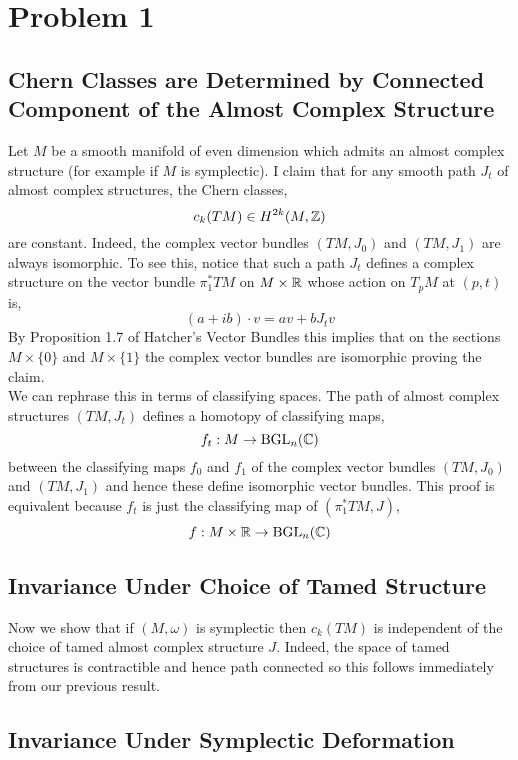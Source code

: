 \documentclass[12pt]{article}
\begin{document}

\newcommand{\can}{\mathrm{can}}

\section{Problem 1}

\subsection{Chern Classes are Determined by Connected Component of the Almost Complex Structure}

Let $M$ be a smooth manifold of even dimension which admits an almost complex structure (for example if $M$ is symplectic). 
I claim that for any smooth path $J_t$ of almost complex structures, the Chern classes,
\[ c_k(TM) \in H^{2k}(M, \mathbb{Z}) \]
are constant. Indeed, the complex vector bundles $(TM, J_0)$ and $(TM, J_1)$ are always isomorphic. To see this, notice that such a path $J_t$ defines a complex structure on the vector bundle $\pi_1^* TM$ on $M \times \mathbb{R}$ whose action on $T_p M$ at $(p,t)$ is,
\[ (a + i b) \cdot v = a v + b J_t v \]
By Proposition 1.7 of Hatcher's Vector Bundles this implies that on the sections $M \times \{ 0 \}$ and $M \times \{ 1 \}$ the complex vector bundles are isomorphic proving the claim. 
\bigskip\\
We can rephrase this in terms of classifying spaces. The path of almost complex structures $(TM, J_t)$ defines a homotopy of classifying maps,
\[ f_t : M \to \mathrm{BGL}_n(\mathbb{C}) \]
between the classifying maps $f_0$ and $f_1$ of the complex vector bundles $(TM, J_0)$ and $(TM, J_1)$ and hence these define isomorphic vector bundles. This proof is equivalent because $f_t$ is just the classifying map of $(\pi_1^* TM, J)$,
\[ f : M \times \mathbb{R} \to \mathrm{BGL}_n(\mathbb{C}) \]

\subsection{Invariance Under Choice of Tamed Structure}

Now we show that if $(M, \omega)$ is symplectic then $c_k(TM)$ is independent of the choice of tamed almost complex structure $J$. Indeed, the space of tamed structures is contractible and hence path connected so this follows immediately from our previous result.

\subsection{Invariance Under Symplectic Deformation} 
\end{document}
